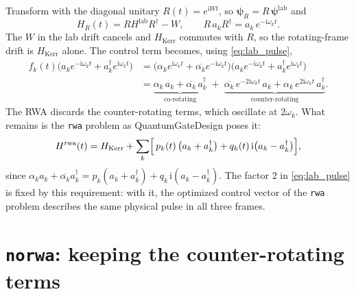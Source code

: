 \documentclass[11pt]{article}
\newcommand{\ii}{\mathrm{i}}
\newcommand{\code}[1]{\texttt{#1}}
\begin{document}
Transform with the diagonal unitary $R(t) = e^{\ii W t}$, so
$\bm\psi_R = R\,\bm\psi^{\mathrm{lab}}$ and
\begin{equation} \label{eq:frame_change}
    H_R(t) = R H^{\mathrm{lab}} R^\dagger - W,
    \qquad
    R\, a_k R^\dagger = a_k\, e^{-\ii \omega_k t}.
\end{equation}
The $W$ in the lab drift cancels and $H_{\mathrm{Kerr}}$ commutes with $R$, so
the rotating-frame drift is $H_{\mathrm{Kerr}}$ alone.  The control term
becomes, using \eqref{eq:lab_pulse},
\begin{align}
    f_k(t)\bigl(a_k e^{-\ii\omega_k t} + a_k^\dagger e^{\ii\omega_k t}\bigr)
    &= \bigl(\alpha_k e^{\ii\omega_k t} + \overline{\alpha_k} e^{-\ii\omega_k t}\bigr)
       \bigl(a_k e^{-\ii\omega_k t} + a_k^\dagger e^{\ii\omega_k t}\bigr) \nonumber \\
    &= \underbrace{\alpha_k\, a_k + \overline{\alpha_k}\, a_k^\dagger}_{\text{co-rotating}}
     \;+\; \underbrace{\overline{\alpha_k}\, e^{-2\ii\omega_k t}\, a_k
         + \alpha_k\, e^{2\ii\omega_k t}\, a_k^\dagger}_{\text{counter-rotating}}.
     \label{eq:rotating_control}
\end{align}
The RWA discards the counter-rotating terms, which oscillate at $2\omega_k$.
What remains is the \code{rwa} problem as QuantumGateDesign poses it:
\begin{equation} \label{eq:rwa_hamiltonian}
    H^{\mathrm{rwa}}(t)
    = H_{\mathrm{Kerr}}
    + \sum_k \Bigl[\, p_k(t)\,\bigl(a_k + a_k^\dagger\bigr)
        + q_k(t)\, \ii\bigl(a_k - a_k^\dagger\bigr) \Bigr],
\end{equation}
since $\alpha_k a_k + \overline{\alpha_k} a_k^\dagger
= p_k (a_k + a_k^\dagger) + q_k\, \ii (a_k - a_k^\dagger)$.  The factor $2$ in
\eqref{eq:lab_pulse} is fixed by this requirement: with it, the optimized
control vector of the \code{rwa} problem describes the same physical pulse in
all three frames.

\section{\code{norwa}: keeping the counter-rotating terms}
\end{document}
